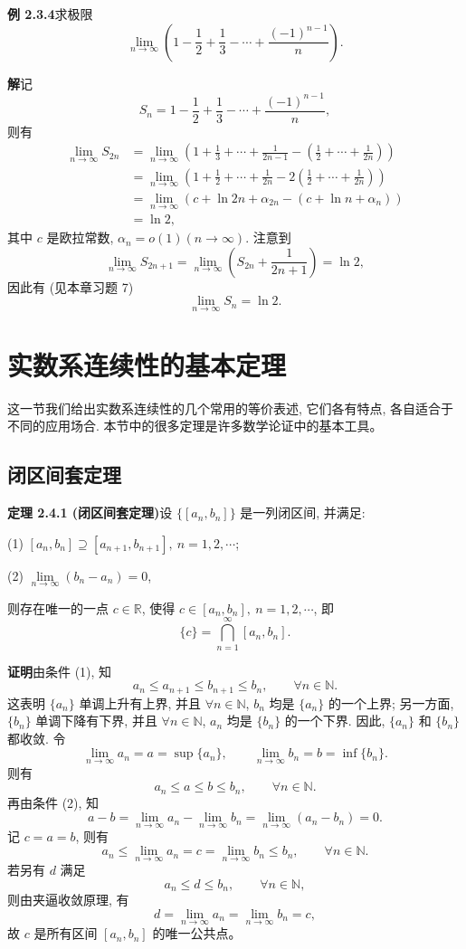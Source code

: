 \documentclass[UTF8,12pt,a4paper,fontset=fandol]{ctexart}
\begin{document}
\noindent\textbf{例 2.3.4}\quad 求极限
\[
  \lim_{n\to\infty}\left(1-\frac12+\frac13-\cdots+\frac{(-1)^{n-1}}n\right).
\]

\noindent\textbf{解}\quad 记
\[
  S_n=1-\frac12+\frac13-\cdots+\frac{(-1)^{n-1}}n,
\]
则有
\[
\begin{aligned}
  \lim_{n\to\infty}S_{2n}
  &=
  \lim_{n\to\infty}
  \left(1+\frac13+\cdots+\frac1{2n-1}
  -\left(\frac12+\cdots+\frac1{2n}\right)\right)\\
  &=
  \lim_{n\to\infty}
  \left(1+\frac12+\cdots+\frac1{2n}
  -2\left(\frac12+\cdots+\frac1{2n}\right)\right)\\
  &=
  \lim_{n\to\infty}
  \left(c+\ln2n+\alpha_{2n}-(c+\ln n+\alpha_n)\right)\\
  &=
  \ln2,
\end{aligned}
\]
其中 $c$ 是欧拉常数, $\alpha_n=o(1)(n\to\infty)$. 注意到
\[
  \lim_{n\to\infty}S_{2n+1}
  =
  \lim_{n\to\infty}\left(S_{2n}+\frac1{2n+1}\right)
  =
  \ln2,
\]
因此有 (见本章习题 7)
\[
  \lim_{n\to\infty}S_n=\ln2.
\]

\section{实数系连续性的基本定理}

这一节我们给出实数系连续性的几个常用的等价表述, 它们各有特点, 各自适合于不同的应用场合. 本节中的很多定理是许多数学论证中的基本工具。

\subsection{闭区间套定理}

\noindent\textbf{定理 2.4.1 (闭区间套定理)}\quad 设 $\{[a_n,b_n]\}$ 是一列闭区间, 并满足:

(1) $[a_n,b_n]\supseteq[a_{n+1},b_{n+1}],\ n=1,2,\cdots$;

(2) $\lim\limits_{n\to\infty}(b_n-a_n)=0$,

则存在唯一的一点 $c\in\mathbb{R}$, 使得 $c\in[a_n,b_n],\ n=1,2,\cdots$, 即
\[
  \{c\}=\bigcap_{n=1}^\infty [a_n,b_n].
\]

\noindent\textbf{证明}\quad 由条件 (1), 知
\[
  a_n\leqslant a_{n+1}\leqslant b_{n+1}\leqslant b_n,\qquad \forall n\in\mathbb{N}.
\]
这表明 $\{a_n\}$ 单调上升有上界, 并且 $\forall n\in\mathbb{N}$, $b_n$ 均是 $\{a_n\}$ 的一个上界; 另一方面, $\{b_n\}$ 单调下降有下界, 并且 $\forall n\in\mathbb{N}$, $a_n$ 均是 $\{b_n\}$ 的一个下界. 因此, $\{a_n\}$ 和 $\{b_n\}$ 都收敛. 令
\[
  \lim_{n\to\infty}a_n=a=\sup\{a_n\},\qquad
  \lim_{n\to\infty}b_n=b=\inf\{b_n\}.
\]
则有
\[
  a_n\leqslant a\leqslant b\leqslant b_n,\qquad \forall n\in\mathbb{N}.
\]
再由条件 (2), 知
\[
  a-b=\lim_{n\to\infty}a_n-\lim_{n\to\infty}b_n
  =
  \lim_{n\to\infty}(a_n-b_n)=0.
\]
记 $c=a=b$, 则有
\[
  a_n\leqslant\lim_{n\to\infty}a_n=c=\lim_{n\to\infty}b_n\leqslant b_n,\qquad \forall n\in\mathbb{N}.
\]
若另有 $d$ 满足
\[
  a_n\leqslant d\leqslant b_n,\qquad \forall n\in\mathbb{N},
\]
则由夹逼收敛原理, 有
\[
  d=\lim_{n\to\infty}a_n=\lim_{n\to\infty}b_n=c,
\]
故 $c$ 是所有区间 $[a_n,b_n]$ 的唯一公共点。
\end{document}

